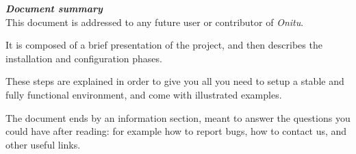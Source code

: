 \thispagestyle{empty}
\vspace*{10mm}

\textbf{\emph{\textcolor{onitu}{\large{Document summary} } } }\\

This document is addressed to any future user or contributor of \emph{Onitu}.

It is composed of a brief presentation of the project, and then describes the installation and configuration phases.

These steps are explained in order to give you all you need to setup a stable and fully functional environment, and come with illustrated examples.

The document ends by an information section, meant to answer the questions you could have after reading: for example how to report bugs, how to contact us, and other useful links.

\clearpage
